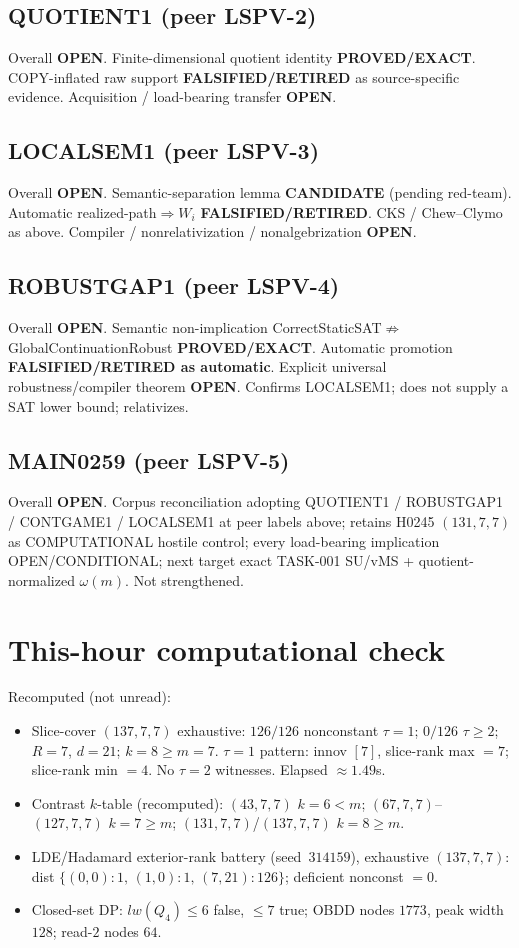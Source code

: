 \documentclass[11pt]{article}
\begin{document}
\subsection*{QUOTIENT1 (peer LSPV-2)}
Overall \textbf{OPEN}. Finite-dimensional quotient identity \textbf{PROVED/EXACT}.
COPY-inflated raw support \textbf{FALSIFIED/RETIRED} as source-specific evidence.
Acquisition / load-bearing transfer \textbf{OPEN}.

\subsection*{LOCALSEM1 (peer LSPV-3)}
Overall \textbf{OPEN}. Semantic-separation lemma \textbf{CANDIDATE} (pending red-team).
Automatic realized-path$\Rightarrow W_i$ \textbf{FALSIFIED/RETIRED}.
CKS / Chew--Clymo as above. Compiler / nonrelativization / nonalgebrization \textbf{OPEN}.

\subsection*{ROBUSTGAP1 (peer LSPV-4)}
Overall \textbf{OPEN}. Semantic non-implication CorrectStaticSAT$\not\Rightarrow$GlobalContinuationRobust
\textbf{PROVED/EXACT}. Automatic promotion \textbf{FALSIFIED/RETIRED as automatic}.
Explicit universal robustness/compiler theorem \textbf{OPEN}. Confirms LOCALSEM1;
does not supply a SAT lower bound; relativizes.

\subsection*{MAIN0259 (peer LSPV-5)}
Overall \textbf{OPEN}. Corpus reconciliation adopting QUOTIENT1 / ROBUSTGAP1 / CONTGAME1 /
LOCALSEM1 at peer labels above; retains H0245 $(131,7,7)$ as COMPUTATIONAL hostile control;
every load-bearing implication OPEN/CONDITIONAL; next target exact TASK-001 SU/vMS +
quotient-normalized $\omega(m)$. Not strengthened.

\section*{This-hour computational check}
Recomputed (not unread):
\begin{itemize}
\item Slice-cover $(137,7,7)$ exhaustive: $126/126$ nonconstant $\tau{=}1$;
  $0/126$ $\tau{\ge}2$; $R{=}7$, $d{=}21$; $k{=}8{\ge}m{=}7$.
  $\tau{=}1$ pattern: innov $[7]$, slice-rank max $=7$; slice-rank min $=4$.
  No $\tau{=}2$ witnesses. Elapsed $\approx1.49$s.
\item Contrast $k$-table (recomputed): $(43,7,7)$ $k{=}6{<}m$;
  $(67,7,7)$--$(127,7,7)$ $k{=}7{\ge}m$; $(131,7,7)$/$(137,7,7)$ $k{=}8{\ge}m$.
\item LDE/Hadamard exterior-rank battery (seed~$314159$), exhaustive $(137,7,7)$:
  dist $\{(0,0){:}1,\,(1,0){:}1,\,(7,21){:}126\}$; deficient nonconst $=0$.
\item Closed-set DP: $lw(Q_4)\le6$ false, $\le7$ true; OBDD nodes $1773$, peak width $128$;
  read-$2$ nodes $64$.
\end{itemize}
\end{document}
